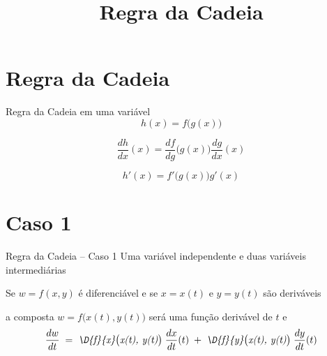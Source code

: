 \documentclass[fleqn,utf8,aspectratio=169,12pt,ignorenonframetext]{beamer}
\title{Regra da Cadeia}
\begin{document}
\addtitle

\section{Regra da Cadeia}

\begin{frame}{Regra da Cadeia em uma variável}
    \[
        h(x) = f\big(g(x)\big)
    \]

    \pause
    \vspace{\baselineskip}
    \[
        \frac{dh}{dx}(x) = \frac{df}{dg}\big(g(x)\big)\frac{dg}{dx}(x)
    \]

    \pause
    \vspace{\baselineskip}
    \[
        h'(x) = f'\big(g(x)\big) g'(x)
    \]
\end{frame}

\section{Caso 1}

\begin{frame}{Regra da Cadeia -- Caso 1}
    Uma variável independente e duas variáveis intermediárias
    \vspace{\baselineskip}

    \pause
    Se \(w=f(x, y)\) é diferenciável
    \pause
    e se \(x=x(t)\) e \(y=y(t)\) são deriváveis

    \pause
    \vspace{.5\baselineskip}
    a composta \(w=f\big(x(t), y(t)\big)\) será uma função derivável de $t$ e
    \pause
    \[
        \frac{dw}{dt}
        \;=\; \emph{\D{f}{x}\big(x(t), y(t)\big)}\; \frac{dx}{dt}(t)
        \;+\; \emph{\D{f}{y}\big(x(t), y(t)\big)}\; \frac{dy}{dt}(t)
    \]
\end{frame}



\end{document}
